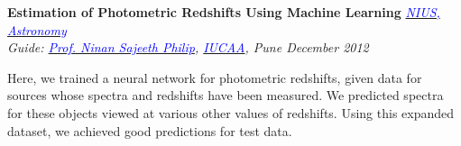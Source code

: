 \documentclass[margin,line]{res}
\newenvironment{list1}{
  \begin{list}{\ding{113}}{%
      \setlength{\itemsep}{0in}
      \setlength{\parsep}{0in} \setlength{\parskip}{0in}
      \setlength{\topsep}{0in} \setlength{\partopsep}{0in} 
      \setlength{\leftmargin}{0.17in}}}{\end{list}}
\begin{document}
\begin{resume}
{\bf Estimation of Photometric Redshifts Using Machine Learning} \hfill \textit{\href{http://nius.hbcse.tifr.res.in/}{\textcolor{blue} {NIUS, Astronomy}}} \\
{\em Guide: \href{http://www.iucaa.ernet.in/~nspp/}{\textcolor{blue}{Prof. Ninan Sajeeth Philip}}, \href{http://www.iucaa.ernet.in/}{\textcolor{blue} {IUCAA}}, Pune \hfill December 2012} \\
\vspace*{-.15in}
\begin{list1}
\item[] Here, we trained a neural network for photometric redshifts, given data for sources whose spectra and redshifts have been measured. We predicted spectra for these objects viewed at various other values of redshifts. Using this expanded dataset, we achieved good predictions for test data.
\end{list1}


\end{resume}
\end{document}
